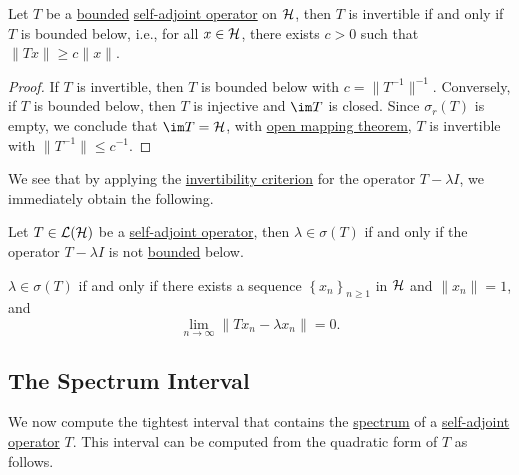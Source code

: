 \begin{lemma}\label{lma:invertibility-criterion}
	Let \(T\) be a \hyperref[rmk:bounded-op]{bounded} \hyperref[def:self-adjoint-op]{self-adjoint operator} on \(\mathcal{\MakeUppercase{h}} \), then \(T\) is invertible if and only if \(T\) is bounded below, i.e., for all \(x\in \mathcal{\MakeUppercase{h}} \), there exists \(c>0\) such that \(\lVert Tx \rVert \geq c\lVert x \rVert \).
\end{lemma}
\begin{proof}
	If \(T\) is invertible, then \(T\) is bounded below with \(c = \lVert T^{-1}  \rVert ^{-1} \). Conversely, if \(T\) is bounded below, then \(T\) is injective and \(\im T\) is closed. Since \(\sigma _r(T)\) is empty, we conclude that \(\im T=\mathcal{\MakeUppercase{h}} \), with \hyperref[thm:open-mapping]{open mapping theorem}, \(T\) is invertible with \(\lVert T^{-1}  \rVert \leq c^{-1} \).
\end{proof}

We see that by applying the \hyperref[lma:invertibility-criterion]{invertibility criterion} for the operator \(T - \lambda I\), we immediately obtain the following.

\begin{corollary}\label{col:criterion-of-spectrum-points}
	Let \(T\in \mathcal{\MakeUppercase{l}} (\mathcal{\MakeUppercase{h}} )\) be a \hyperref[def:self-adjoint-op]{self-adjoint operator}, then \(\lambda \in \sigma (T)\) if and only if the operator \(T - \lambda I\) is not \hyperref[rmk:bounded-op]{bounded} below.
\end{corollary}

\begin{remark}
	\(\lambda \in \sigma (T)\) if and only if there exists a sequence \(\left\{ x_n \right\} _{n\geq 1}\) in \(\mathcal{\MakeUppercase{h}} \) and \(\lVert x_n \rVert = 1\), and
	\[
		\lim_{n \to \infty} \lVert Tx_n - \lambda x_n \rVert = 0.
	\]
\end{remark}

\subsection{The Spectrum Interval}
We now compute the tightest interval that contains the \hyperref[def:spectrum-point]{spectrum} of a \hyperref[def:self-adjoint-op]{self-adjoint operator} \(T\). This interval can be computed from the quadratic form of \(T\) as follows.

